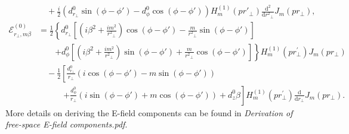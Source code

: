 \documentclass[]{report}
\begin{document}
\begin{align}
&\quad +\frac{i}{2}\left(d^0_{r\!_\perp}\sin(\phi\!-\!\phi') - d^0_\phi\cos(\phi\!-\!\phi')\right)  H_m^{(1)}(pr'\!_\perp) \frac{\mathrm{d}^2}{\mathrm{d}r^2\!\!_\perp}J_m(pr\!_\perp),\\
\mathcal{E}_{r\!_\perp,m\beta}^{(0)} 
&= \frac{1}{2}\left\{ d^0_{r\!_\perp}\left[ \left( i\beta^2+\frac{im^2}{r^2\!\!_\perp}\right)\cos(\phi\!-\!\phi')-\frac{m}{r^2\!\!_\perp}\sin(\phi\!-\!\phi')\right]\right.\nonumber\\
&\quad\quad\left.+d^0_\phi\left[ \left( i\beta^2+\frac{im^2}{r^2\!\!_\perp}\right)\sin(\phi\!-\!\phi')+\frac{m}{r^2\!\!_\perp}\cos(\phi\!-\!\phi')\right]\right\}H_m^{(1)}\left( {pr\!_\perp^{\prime} }\right) J_{m}\left( pr\!_\perp \right)\nonumber\\
&\quad -\frac{1}{2}\left[\frac{d^0_{r\!_\perp}}{r\!_\perp}\left(i\cos(\phi\!-\!\phi') \!-\! m\sin(\phi\!-\!\phi') \right)\right.\nonumber\\ &\quad\qquad\left.+\frac{d^0_\phi}{r\!_\perp}\left(i\sin(\phi\!-\!\phi') \!+\! m\cos(\phi\!-\!\phi') \right) \!+\! d^0_z \beta\right]\! H_m^{(1)}\!\left( {pr\!_\perp^{\prime} }\right)\! \frac{\mathrm{d}}{\mathrm{d}r\!_\perp}\! J_{m}\!\left( pr\!_\perp \right).
\end{align}
More details on deriving the E-field components can be found in \textit{Derivation of free-space E-field components.pdf}.
\end{document}
